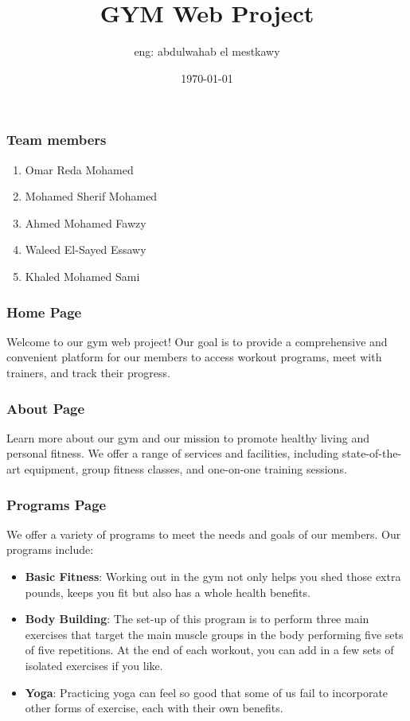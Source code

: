 \documentclass{beamer}
\title{GYM Web Project}
\author{eng: abdulwahab el mestkawy}
\date{\today}
\begin{document}
\begin{frame}
\titlepage
\end{frame}

\begin{frame}
\frametitle{Team members}
\begin{enumerate}
\item Omar Reda Mohamed
\item Mohamed Sherif Mohamed
\item Ahmed Mohamed Fawzy
\item Waleed El-Sayed Essawy
\item Khaled Mohamed Sami
\end{enumerate}
\end{frame}

\begin{frame}
\frametitle{Home Page}

Welcome to our gym web project! Our goal is to provide a comprehensive and convenient platform for our members to access workout programs, meet with trainers, and track their progress.
\end{frame}

\begin{frame}
\frametitle{About Page}

Learn more about our gym and our mission to promote healthy living and personal fitness. We offer a range of services and facilities, including state-of-the-art equipment, group fitness classes, and one-on-one training sessions.
\end{frame}

\begin{frame}
\frametitle{Programs Page}

We offer a variety of programs to meet the needs and goals of our members. Our programs include:

\begin{itemize}
\item \textbf{Basic Fitness}: Working out in the gym not only helps you shed those extra pounds, keeps you fit but also has a whole health benefits.
\item \textbf{Body Building}: The set-up of this program is to perform three main exercises that target the main muscle groups in the body performing five sets of five repetitions. At the end of each workout, you can add in a few sets of isolated exercises if you like.
\item \textbf{Yoga}: Practicing yoga can feel so good that some of us fail to incorporate other forms of exercise, each with their own benefits.
\end{itemize}
\end{frame}
\end{document}
